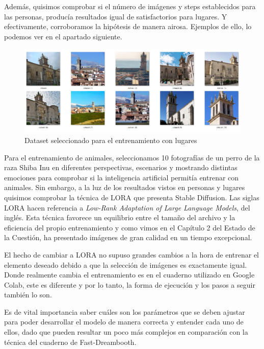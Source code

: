 Además, quisimos comprobar si el número de imágenes y steps establecidos para las personas, producía resultados igual de satisfactorios para lugares. Y efectivamente, corroboramos la hipótesis de manera airosa. Ejemplos de ello, lo podemos ver en el apartado siguiente.  

\begin{figure}[!htb]
	\centering
	\includegraphics[width = 1
	\textwidth]{Imagenes/Vectorial/dataset_colmenar.png}
	\caption{Dataset seleccionado para el entrenamiento con lugares}
	\label{fig:datasetcolme}
\end{figure}

Para el entrenamiento de animales, seleccionamos 10 fotografías de un perro de la raza Shiba Inu en diferentes perspectivas, escenarios y mostrando distintas emociones para comprobar si la inteligencia artificial permitía entrenar con animales. Sin embargo, a la luz de los resultados vistos en personas y lugares quisimos comprobar la técnica de LORA que presenta Stable Diffusion. Las siglas LORA hacen referencia a \textit{Low-Rank Adaptation of Large Language Models}, del inglés. Esta técnica favorece un equilibrio entre el tamaño del archivo y la eficiencia del propio entrenamiento y como vimos en el Capítulo 2 del Estado de la Cuestión, ha presentado imágenes de gran calidad en un tiempo excepcional.

El hecho de cambiar a LORA no supuso grandes cambios a la hora de entrenar el elemento deseado debido a que la selección de imágenes es exactamente igual. Donde realmente cambia el entrenamiento es en el cuaderno utilizado en Google Colab, este es diferente y por lo tanto, la forma de ejecución y los pasos a seguir también lo son. 


Es de vital importancia saber cuáles son los parámetros que se deben ajustar para poder desarrollar el modelo de manera correcta y entender cada uno de ellos, dado que pueden resultar un poco más complejos en comparación con la técnica del cuaderno de Fast-Dreambooth.\\

